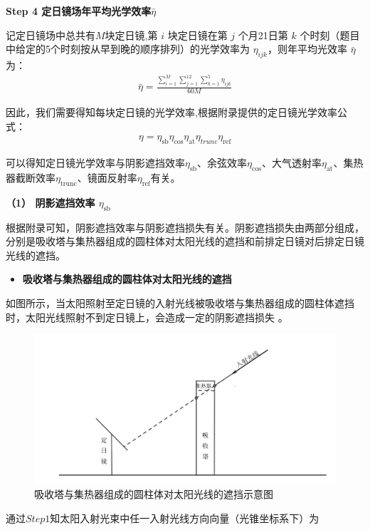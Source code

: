 \documentclass[../main.tex]{subfiles}
\begin{document}
  \noindent \textbf{Step 4 定日镜场年平均光学效率\(\bar{\eta}\)}
  \par 记定日镜场中总共有$M$块定日镜,第 \(i\) 块定日镜在第 \(j\) 个月21日第 \(k\) 个时刻（题目中给定的5个时刻按从早到晚的顺序排列）的光学效率为 \(\eta_{ijk}\)，则年平均光效率 \(\bar{\eta}\) 为：
\begin{align}\label{1.50}
\bar{\eta}=\frac{\sum_{i=1}^M{\sum_{j=1}^{12}{\sum_{k=1}^5{\eta _{ijk}}}}}{60M}
\end{align}
  \par 因此，我们需要得知每块定日镜的光学效率,根据附录提供的定日镜光学效率公式：
  \begin{align}\label{1.18}
\eta =\eta _{\text{sb}}\eta _{\cos}\eta _{\text{at}}\eta _{trunc}\eta _{\text{ref}}
  \end{align}
\par 可以得知定日镜光学效率与阴影遮挡效率$\eta_{\text{sb}}$、余弦效率$\eta_{\text{cos}}$、大气透射率$\eta_{\text{at}}$、集热器截断效率$\eta_{\text{trunc}}$、镜面反射率$\eta_{\text{ref}}$有关。
\par \textbf{（1） 阴影遮挡效率 $\eta_{\text{sb}}$}
\par 根据附录可知，阴影遮挡效率与阴影遮挡损失有关。阴影遮挡损失由两部分组成，分别是吸收塔与集热器组成的圆柱体对太阳光线的遮挡和前排定日镜对后排定日镜光线的遮挡。
\begin{itemize}
  \item \textbf{吸收塔与集热器组成的圆柱体对太阳光线的遮挡}
\end{itemize}
\par 如图所示，当太阳照射至定日镜的入射光线被吸收塔与集热器组成的圆柱体遮挡时，太阳光线照射不到定日镜上，会造成一定的阴影遮挡损失 。
 \begin{figure}[H]
    \centering
    \includegraphics[width=.9\textwidth]{6}
    \caption{吸收塔与集热器组成的圆柱体对太阳光线的遮挡示意图}
    \label{1.19}
\end{figure}
\par 通过$Step1$知太阳入射光束中任一入射光线方向向量（光锥坐标系下）为
\end{document}

